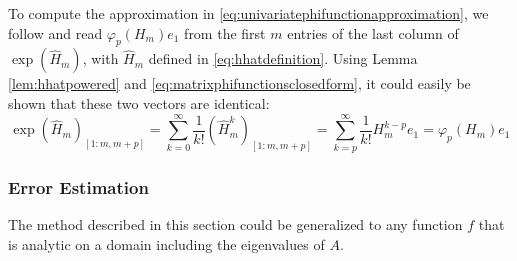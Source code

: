 To compute the approximation in \eqref{eq:univariatephifunctionapproximation}, we follow \cite{niesen2012} and read $\varphi_p(H_m) e_1$
from the first $m$ entries of the last column of $\exp(\hat{H}_m)$, with $\hat{H}_m$ defined in \eqref{eq:hhatdefinition}.
Using Lemma \ref{lem:hhatpowered} and \eqref{eq:matrixphifunctionsclosedform}, it could easily be shown that these two vectors are identical:
\begin{equation*}
    \exp(\hat{H}_m)_{[1 : m, m+p]}
    = \sum_{k=0}^{\infty}{\frac{1}{k!} (\hat{H}_m^k)_{[1 : m, m+p]}}
    = \sum_{k=p}^{\infty}{\frac{1}{k!} H_m^{k-p}e_1} = \varphi_p(H_m) e_1
\end{equation*}


\subsubsection{Error Estimation}
The method described in this section could be generalized to any function $f$ that is
analytic on a domain including the eigenvalues of $A$.

